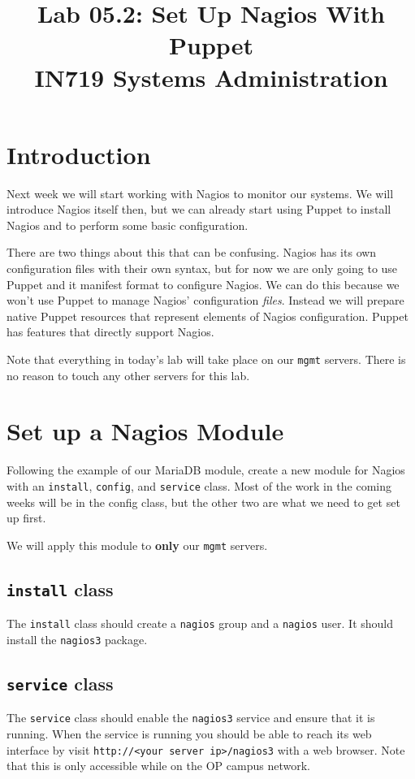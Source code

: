 \documentclass{article}   	%
\title{Lab 05.2:  Set Up Nagios With Puppet\\ IN719 Systems Administration}
\date{}							%
\begin{document}
\maketitle

\section*{Introduction}
Next week we will start working with Nagios to monitor our systems. We will introduce Nagios itself then, but we can already start using Puppet to install Nagios and to perform some basic configuration.

There are two things about this that can be confusing. Nagios has its own configuration files with their own syntax, but for now we are only going to use Puppet and it manifest format to configure Nagios. We can do this because we won't use Puppet to manage Nagios' configuration \emph{files}. Instead we will prepare native Puppet resources that represent elements of Nagios configuration. Puppet has features that directly support Nagios.

Note that everything in today's lab will take place on our \texttt{mgmt} servers. There is no reason to touch any other servers for this lab.


\section{Set up a Nagios Module}
Following the example of our MariaDB module, create a new module for Nagios with an \texttt{install}, \texttt{config}, and \texttt{service} class. Most of the work in the coming weeks will be in the config class, but the other two are what we need to get set up first.

We will apply this module to \textbf{only} our \texttt{mgmt} servers.

\subsection{\texttt{install} class}
The \texttt{install} class should create a \texttt{nagios} group and a \texttt{nagios} user. It should install the \texttt{nagios3} package.

\subsection{\texttt{service} class}
The \texttt{service} class should enable the \texttt{nagios3} service and ensure that it is running. When the service is running you should be able to reach its web interface by visit \texttt{http://<your server ip>/nagios3} with a web browser. Note that this is only accessible while on the OP campus network.
\end{document}
